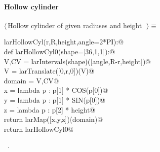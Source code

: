 \documentclass[11pt,oneside]{article}	%
\begin{document}
\paragraph{Hollow cylinder}
\begin{flushleft} \small \label{scrap19}
$\langle\,$Hollow cylinder of given radiuses and height\nobreak\ {\footnotesize {}}$\,\rangle\equiv$
\vspace{-1ex}
\begin{list}{}{} \item
\mbox{}\verb@def larHollowCyl(r,R,height,angle=2*PI):@\\
\mbox{}\verb@   def larHollowCyl0(shape=[36,1,1]):@\\
\mbox{}\verb@      V,CV = larIntervals(shape)([angle,R-r,height])@\\
\mbox{}\verb@      V = larTranslate([0,r,0])(V)@\\
\mbox{}\verb@      domain = V,CV@\\
\mbox{}\verb@      x = lambda p : p[1] * COS(p[0])@\\
\mbox{}\verb@      y = lambda p : p[1] * SIN(p[0])@\\
\mbox{}\verb@      z = lambda p : p[2] * height@\\
\mbox{}\verb@      return larMap([x,y,z])(domain)@\\
\mbox{}\verb@   return larHollowCyl0@\\
\mbox{}\verb@@{\NWsep}
\end{list}
\vspace{-1ex}
\footnotesize\addtolength{\baselineskip}{-1ex}
\begin{list}{}{\setlength{\itemsep}{-\parsep}\setlength{\itemindent}{-\leftmargin}}
\item \NWtxtMacroRefIn\ .
\end{list}
\end{flushleft}
\end{document}
